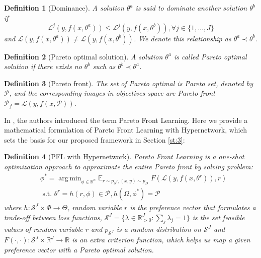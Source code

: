 \documentclass[letterpaper]{article} %
\newtheorem{definition}{Definition}
\DeclareMathOperator*{\argmin}{arg\,min}
\begin{document}
\begin{definition}[Dominance] A solution $\theta^a$ is said to dominate another solution $\theta^b$ if $$\mathcal{L}^j(y, f(x, \theta^a)) \leq \mathcal{L}^j(y, f(x, \theta^b)), \forall j \in \{1,...,J\}$$ and $\mathcal{L}(y, f(x, \theta^a)) \neq \mathcal{L}(y, f(x, \theta^b))$. We denote this relationship as $\theta^a \prec \theta^b$.
\label{def:paretodominance}
\end{definition}

\begin{definition}[Pareto optimal solution] A solution $\theta^a$ is called Pareto optimal solution if there exists no $\theta^b$ such as $\theta^b \prec \theta^a$.
\label{def:paretooptimality}
\end{definition}

\begin{definition}[Pareto front] The set of Pareto optimal is Pareto set, denoted by $\mathcal{P}$, and the corresponding images in objectives space are Pareto front $\mathcal{P}_f=\mathcal{L}(y, f(x, \mathcal{P}))$.
\end{definition}

In \cite{navon2021learning}, the authors introduced the term Pareto Front Learning. Here we provide a mathematical formulation of Pareto Front Learning with Hypernetwork, which sets the basis for our proposed framework in Section \ref{st:3}:
\begin{definition}[PFL with Hypernetwork]
Pareto Front Learning is a one-shot optimization approach to approximate the entire Pareto front by solving problem:
\begin{equation}
\begin{aligned}
    & \phi^* = \argmin_{\phi \in \mathbb{R}^n} \mathbb{E}_{r \sim p_{\mathcal{S}^J}, (x, y) \sim p_D} \;F(\mathcal{L}(y,f(x, \theta^r)), r) \\
    & \text{ s.t. } \theta^r = h(r, \phi) \in \mathcal{P}, h(\Omega, \phi^*) = \mathcal{P}
    \label{eq:plf}
\end{aligned}
\end{equation}
where $h: \mathcal{S}^J \times \Phi \rightarrow \Theta$, random variable $r$ is the preference vector that formulates a trade-off between loss functions, $\mathcal{S}^J = \{\lambda \in \mathbb{R}^J_{>0}: \sum_j \lambda_j = 1\}$ is the set feasible values of random variable $r$ and $p_{\mathcal{S}^J}$ is a random distribution on $\mathcal{S}^J$ and $F(\cdot, \cdot): \mathcal{S}^J \times \mathbb{R}^J \rightarrow \mathbb{R}$ is an extra criterion function, which helps us map a given preference vector with a Pareto optimal solution.

\end{definition}
\end{document}
